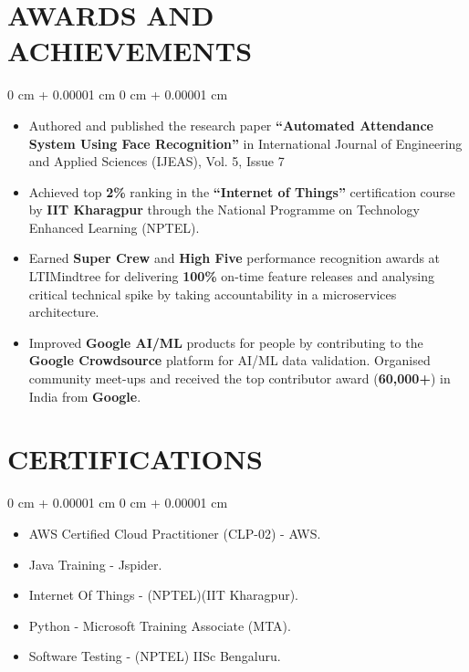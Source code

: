 \documentclass[10pt, letterpaper]{article}
\newenvironment{highlights}{
    \begin{itemize}[
        topsep=0.10 cm,
        parsep=0.10 cm,
        partopsep=0pt,
        itemsep=0pt,
        leftmargin=0 cm + 10pt
    ]
}{
    \end{itemize}
} %
\newenvironment{onecolentry}{
    \begin{adjustwidth}{
        0 cm + 0.00001 cm
    }{
        0 cm + 0.00001 cm
    }
}{
    \end{adjustwidth}
} %
\begin{document}
    
    \vspace{0.1 cm}
    \section{AWARDS AND ACHIEVEMENTS}
    \vspace{0.1 cm}
        \begin{onecolentry}
            \begin{highlights}
                \item {Authored and published the research paper \textbf{“Automated Attendance System Using Face Recognition”} in International Journal of Engineering and Applied Sciences (IJEAS), Vol. 5, Issue 7}
                
                \item {Achieved top \textbf{2\%} ranking in the \textbf{“Internet of Things”} certification course by \textbf{IIT Kharagpur} through the National Programme on Technology Enhanced Learning (NPTEL).}
                
                \item {Earned \textbf{Super Crew} and \textbf{High Five} performance recognition awards at LTIMindtree for delivering \textbf{100\%} on-time feature releases and analysing critical technical spike by taking accountability in a microservices architecture.}
                
                \item {Improved \textbf{Google AI/ML} products for people by contributing to the \textbf{Google Crowdsource} platform for AI/ML data validation. Organised community meet-ups and received the top contributor award (\textbf{60,000+}) in India from \textbf{Google}.}
            \end{highlights}
        \end{onecolentry}

    \vspace{0.1 cm}
    \section{CERTIFICATIONS}
    \vspace{0.1 cm}
        \begin{onecolentry}
            \begin{highlights}
                \item {AWS Certified Cloud Practitioner (CLP-02) - AWS.}
                \item {Java Training - Jspider.}
                \item {Internet Of Things - (NPTEL)(IIT Kharagpur).}
                \item {Python - Microsoft Training Associate (MTA).}
                \item {Software Testing - (NPTEL) IISc Bengaluru.}
                
            \end{highlights}
        \end{onecolentry}
        
\end{document}
